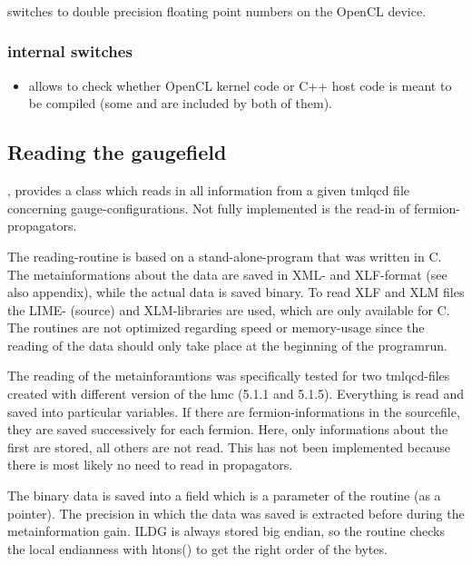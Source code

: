 \subsubsection{}
 switches to double precision floating point numbers on the OpenCL device.
\subsubsection{internal switches}
\begin{itemize}
\item 
{} allows to check whether OpenCL kernel code or C++ host code is meant to be compiled (some  and  are included by both of them).
\end{itemize}

\subsection{Reading the gaugefield}
,  provides a class  which reads in all information from a given tmlqcd file concerning gauge-configurations. Not fully implemented is the read-in of fermion-propagators. 

The reading-routine is based on a stand-alone-program that was written in C. The metainformations about the data are saved in XML- and XLF-format (see also appendix), while the actual data is saved binary. To read XLF and XLM files the LIME- (source) and XLM-libraries are used, which are only available for C. The routines are not optimized regarding speed or memory-usage since the reading of the data should only take place at the beginning of the programrun.

The reading of the metainforamtions was specifically tested for two tmlqcd-files created with different version of the hmc (5.1.1 and 5.1.5). Everything is read and saved into particular variables. If there are fermion-informations in the sourcefile, they are saved successively for each fermion. Here, only informations about the first are stored, all others are not read. This has not been implemented because there is most likely no need to read in propagators.

The binary data is saved into a field which is a parameter of the routine (as a pointer). The precision in which the data was saved is extracted before during the metainformation gain. ILDG is always stored big endian, so the routine checks the local endianness with htons() to get the right order of the bytes.




